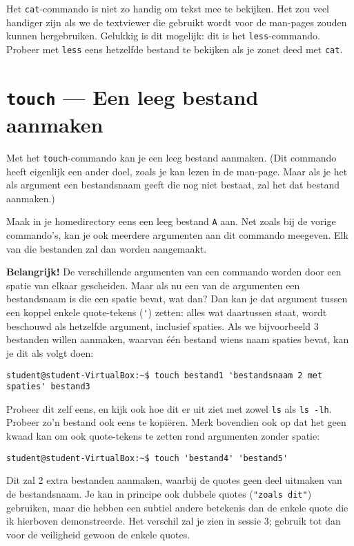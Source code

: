 \documentclass[a4paper,twoside,openany]{memoir}
\begin{document}
Het \verb!cat!-commando is niet zo handig om tekst mee te bekijken. Het zou veel
handiger zijn als we de textviewer die gebruikt wordt voor de man-pages zouden
kunnen hergebruiken. Gelukkig is dit mogelijk: dit is het \verb!less!-commando.
Probeer met \verb!less! eens hetzelfde bestand te bekijken als je zonet deed met
\verb!cat!.

\section{\texttt{touch} --- Een leeg bestand aanmaken}

Met het \verb!touch!-commando kan je een leeg bestand aanmaken. (Dit commando
heeft eigenlijk een ander doel, zoals je kan lezen in de man-page. Maar als je
het als argument een bestandsnaam geeft die nog niet bestaat, zal het dat
bestand aanmaken.)

Maak in je homedirectory eens een leeg bestand \verb!A! aan. Net zoals bij de
vorige commando's, kan je ook meerdere argumenten aan dit commando meegeven. Elk
van die bestanden zal dan worden aangemaakt.

\textbf{Belangrijk!} De verschillende argumenten van een commando worden door
een spatie van elkaar gescheiden. Maar als nu een van de argumenten een
bestandsnaam is die een spatie bevat, wat dan? Dan kan je dat argument tussen
een koppel enkele quote-tekens (\verb!'!) zetten: alles wat daartussen staat,
wordt beschouwd als hetzelfde argument, inclusief spaties. Als we bijvoorbeeld 3
bestanden willen aanmaken, waarvan één bestand wiens naam spaties bevat, kan je
dit als volgt doen:

\begin{verbatim}
student@student-VirtualBox:~$ touch bestand1 'bestandsnaam 2 met spaties' bestand3
\end{verbatim}

Probeer dit zelf eens, en kijk ook hoe dit er uit ziet met zowel \verb!ls! als
\verb!ls -lh!. Probeer zo'n bestand ook eens te kopiëren. Merk bovendien ook op
dat het geen kwaad kan om ook quote-tekens te zetten rond argumenten zonder
spatie:

\begin{verbatim}
student@student-VirtualBox:~$ touch 'bestand4' 'bestand5'
\end{verbatim}

Dit zal 2 extra bestanden aanmaken, waarbij de quotes geen deel uitmaken van de
bestandsnaam. Je kan in principe ook dubbele quotes (\verb!"zoals dit"!)
gebruiken, maar die hebben een subtiel andere betekenis dan de enkele quote die
ik hierboven demonstreerde. Het verschil zal je zien in sessie 3; gebruik tot
dan voor de veiligheid gewoon de enkele quotes.
\end{document}
